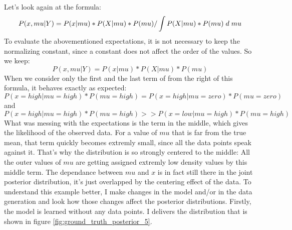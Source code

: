 \documentclass{article}
\begin{document}
Let's look again at the formula:
\begin{equation}
P(x,mu|Y) = P(x|mu) * P(X|mu) * P(mu) / \int P(X|mu) * P(mu) \hspace{1mm} d \hspace{1mm} mu
\end{equation}
To evaluate the abovementioned expectations, it is not necessary to keep the normalizing constant, since a constant does not affect the order of the values. So we keep:
\begin{equation}
P(x,mu|Y) = P(x|mu) * P(X|mu) * P(mu)
\end{equation}
When we consider only the first and the last term of from the right of this formula, it behaves exactly as expected: \begin{equation}
P(x=high|mu=high)*P(mu=high) = P(x=high|mu=zero)*P(mu=zero)
\end{equation}
and 
\begin{equation}
P(x=high|mu=high)*P(mu=high) >> P(x=low|mu=high)*P(mu=high)
\end{equation} What was messing with the expectations is the term in the middle, which gives the likelihood of the observed data. For a value of $mu$ that is far from the true mean, that term quickly becomes extremly small, since all the data points speak against it. That's why the distribution is so strongly centered to the middle: All the outer values of $mu$ are getting assigned extremly low density values by this middle term. 
The dependance between $mu$ and $x$ is in fact still there in the joint posterior distribution, it's just overlapped by the centering effect of the data. To understand this example better, I make changes in the model and/or in the data generation and look how those changes affect the posterior distributions. Firstly, the model is learned without any data points. I delivers the distribution that is shown in figure \ref{fig:ground_truth_posterior_5}.
\end{document}
